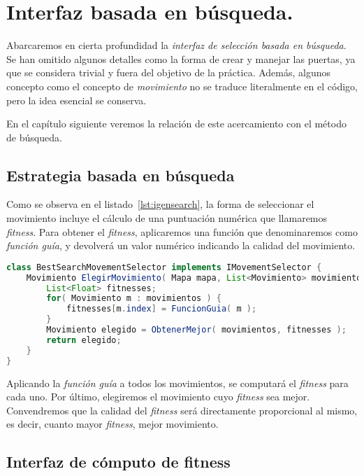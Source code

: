 \chapter{Interfaz basada en búsqueda.}\label{cap:capitulo5}

Abarcaremos en cierta profundidad la \emph{interfaz de selección basada en búsqueda}. Se han omitido algunos detalles como la forma de crear y manejar las puertas, ya que se considera trivial y fuera del objetivo de la práctica. Además, algunos concepto como el concepto de \emph{movimiento} no se traduce literalmente en el código, pero la idea esencial se conserva.

En el capítulo siguiente veremos la relación de este acercamiento con el método de búsqueda.

\section{Estrategia basada en búsqueda}

Como se observa en el listado~\ref{lst:igensearch}, la forma de seleccionar el movimiento incluye el cálculo de una puntuación numérica que llamaremos \emph{fitness}. Para obtener el \emph{fitness}, aplicaremos una función que denominaremos como \emph{función guía}, y devolverá un valor numérico indicando la calidad del movimiento.

\begin{lstlisting}[caption={Interfaz de selección de movimiento basada en búsqueda},label={lst:igensearch},language=Java,escapechar=|]
class BestSearchMovementSelector implements IMovementSelector {
	Movimiento ElegirMovimiento( Mapa mapa, List<Movimiento> movimientos ) {
		List<Float> fitnesses;
		for( Movimiento m : movimientos ) {
			fitnesses[m.index] = FuncionGuia( m );
		}
		Movimiento elegido = ObtenerMejor( movimientos, fitnesses );
		return elegido;
	}
}
\end{lstlisting}

Aplicando la \emph{función guía} a todos los movimientos, se computará el \emph{fitness} para cada uno. Por último, elegiremos el movimiento cuyo \emph{fitness} sea mejor. Convendremos que la calidad del \emph{fitness} será directamente proporcional al mismo, es decir, cuanto mayor \emph{fitness}, mejor movimiento.

\section{Interfaz de cómputo de fitness}

